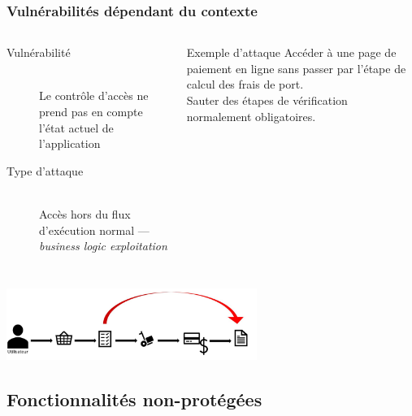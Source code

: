 \documentclass[aspectratio=169]{beamer}  %
\begin{document}
\begin{frame}
  \frametitle{Vulnérabilités dépendant du contexte}
  \begin{columns}[c]
      \begin{description}
        \item[Vulnérabilité] \hfill \\ Le contrôle d'accès ne prend pas en compte l'état actuel de l'application
        \item[Type d'attaque] \hfill \\ Accès hors du flux d'exécution normal --- \emph{business logic exploitation}
      \end{description}
      \begin{block}{Exemple d'attaque}
        Accéder à une page de paiement en ligne sans passer par l'étape de calcul des frais de port.\\
        Sauter des étapes de vérification normalement obligatoires.
      \end{block}
  \end{columns}
  \begin{center}
    \includegraphics[width=22em]{escalade-hors-flux}
  \end{center}
\end{frame}



\subsection{Fonctionnalités non-protégées}
\end{document}
